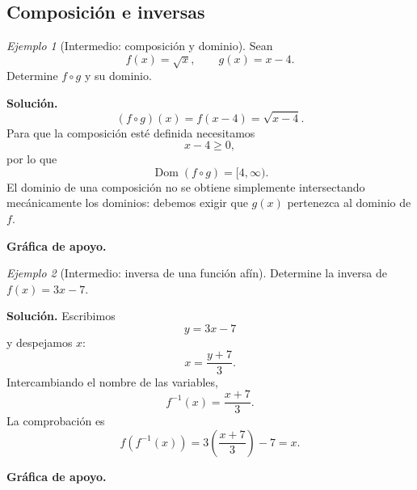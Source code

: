 \documentclass[12pt]{article}
\theoremstyle{remark}
\newtheorem{ejemplo}{Ejemplo}[section]
\newcommand{\Dom}{\operatorname{Dom}}
\begin{document}
\subsection{Composición e inversas}

\begin{ejemplo}[Intermedio: composición y dominio]
Sean
\[
f(x)=\sqrt{x},\qquad g(x)=x-4.
\]
Determine $f\circ g$ y su dominio.

\textbf{Solución.}
\[
(f\circ g)(x)=f(x-4)=\sqrt{x-4}.
\]
Para que la composición esté definida necesitamos
\[
x-4\ge0,
\]
por lo que
\[
\boxed{\Dom(f\circ g)=[4,\infty)}.
\]
El dominio de una composición no se obtiene simplemente intersectando mecánicamente los dominios: debemos exigir que $g(x)$ pertenezca al dominio de $f$.


\textbf{Gráfica de apoyo.}\medskip
\begin{center}
\end{center}

\end{ejemplo}

\begin{ejemplo}[Intermedio: inversa de una función afín]
Determine la inversa de $f(x)=3x-7$.

\textbf{Solución.} Escribimos
\[
y=3x-7
\]
y despejamos $x$:
\[
x=\frac{y+7}{3}.
\]
Intercambiando el nombre de las variables,
\[
\boxed{f^{-1}(x)=\frac{x+7}{3}}.
\]
La comprobación es
\[
f(f^{-1}(x))=3\left(\frac{x+7}{3}\right)-7=x.
\]


\textbf{Gráfica de apoyo.}\medskip
\begin{center}
\end{center}

\end{ejemplo}
\end{document}

